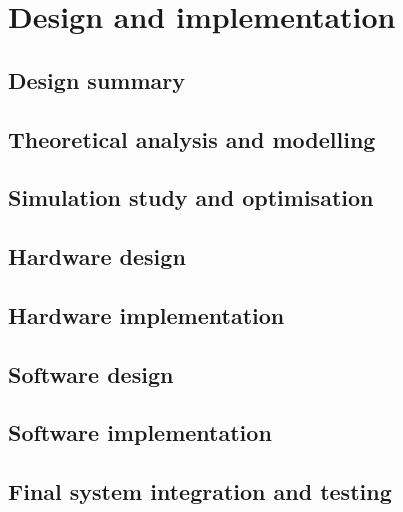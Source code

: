
\section{Design and implementation}

\subsection{Design summary}

\subsection{Theoretical analysis and modelling}

\subsection{Simulation study and optimisation}

\subsection{Hardware design}

\subsection{Hardware implementation}

\subsection{Software design}

\subsection{Software implementation}

\subsection{Final system integration and testing}

\newpage


